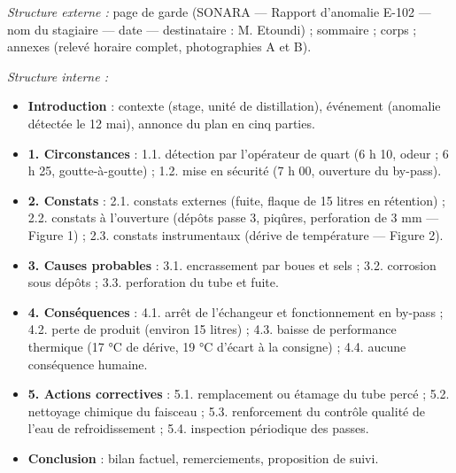 \documentclass[11pt]{article}
\begin{document}
\begin{exoresolu}
\emph{Structure externe :} page de garde (SONARA — Rapport d'anomalie E-102 — nom du stagiaire — date — destinataire : M. Etoundi) ; sommaire ; corps ; annexes (relevé horaire complet, photographies A et B).

\emph{Structure interne :}
\begin{itemize}
\item \textbf{Introduction} : contexte (stage, unité de distillation), événement (anomalie détectée le 12 mai), annonce du plan en cinq parties.
\item \textbf{1. Circonstances} : 1.1. détection par l'opérateur de quart (6 h 10, odeur ; 6 h 25, goutte-à-goutte) ; 1.2. mise en sécurité (7 h 00, ouverture du by-pass).
\item \textbf{2. Constats} : 2.1. constats externes (fuite, flaque de 15 litres en rétention) ; 2.2. constats à l'ouverture (dépôts passe 3, piqûres, perforation de 3 mm — Figure 1) ; 2.3. constats instrumentaux (dérive de température — Figure 2).
\item \textbf{3. Causes probables} : 3.1. encrassement par boues et sels ; 3.2. corrosion sous dépôts ; 3.3. perforation du tube et fuite.
\item \textbf{4. Conséquences} : 4.1. arrêt de l'échangeur et fonctionnement en by-pass ; 4.2. perte de produit (environ 15 litres) ; 4.3. baisse de performance thermique (17 °C de dérive, 19 °C d'écart à la consigne) ; 4.4. aucune conséquence humaine.
\item \textbf{5. Actions correctives} : 5.1. remplacement ou étamage du tube percé ; 5.2. nettoyage chimique du faisceau ; 5.3. renforcement du contrôle qualité de l'eau de refroidissement ; 5.4. inspection périodique des passes.
\item \textbf{Conclusion} : bilan factuel, remerciements, proposition de suivi.
\end{itemize}


\end{exoresolu}
\end{document}
